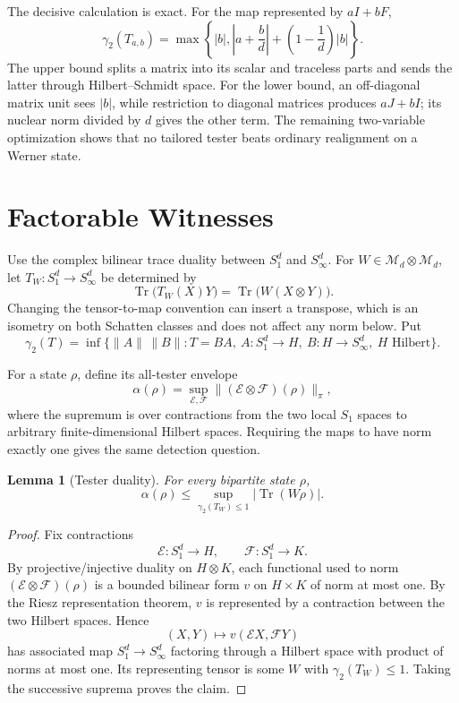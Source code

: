 \documentclass[11pt]{amsart}
\newtheorem{lemma}{Lemma}
\newcommand{\M}{\mathcal M}
\newcommand{\Tr}{\operatorname{Tr}}
\newcommand{\gammatwo}{\gamma_2}
\begin{document}
The decisive calculation is exact.  For the map represented by $aI+bF$,
\[
 \gammatwo(T_{a,b})
 =\max\left\{|b|,
 \left|a+\frac bd\right|+\left(1-\frac1d\right)|b|\right\}.
\]
The upper bound splits a matrix into its scalar and traceless parts and sends
the latter through Hilbert--Schmidt space.  For the lower bound, an
off-diagonal matrix unit sees $|b|$, while restriction to diagonal matrices
produces $aJ+bI$; its nuclear norm divided by $d$ gives the other term.
The remaining two-variable optimization shows that no tailored tester beats
ordinary realignment on a Werner state.

\section*{Factorable Witnesses}
\par\medskip
Use the complex bilinear trace duality between $S_1^d$ and $S_\infty^d$.
For $W\in\M_d\otimes\M_d$, let $T_W:S_1^d\to S_\infty^d$ be determined by
\[
 \Tr\bigl(T_W(X)Y\bigr)=\Tr\bigl(W(X\otimes Y)\bigr).
\]
Changing the tensor-to-map convention can insert a transpose, which is an
isometry on both Schatten classes and does not affect any norm below.  Put
\[
 \gammatwo(T)=\inf\{\|A\|\,\|B\|:
 T=BA,\ A:S_1^d\to H,\ B:H\to S_\infty^d,
 \ H\text{ Hilbert}\}.
\]

For a state $\rho$, define its all-tester envelope
\[
 \alpha(\rho)=\sup_{\mathcal E,\mathcal F}
 \|(\mathcal E\otimes\mathcal F)(\rho)\|_\pi,
\]
where the supremum is over contractions from the two local $S_1$ spaces to
arbitrary finite-dimensional Hilbert spaces.  Requiring the maps to have norm
exactly one gives the same detection question.

\begin{lemma}[Tester duality]\label{lem:duality}
For every bipartite state $\rho$,
\[
 \alpha(\rho)\leq
 \sup_{\gammatwo(T_W)\leq1}|\Tr(W\rho)|.
\]
\end{lemma}

\begin{proof}
Fix contractions
\[
 \mathcal E:S_1^d\to H,\qquad \mathcal F:S_1^d\to K.
\]
By projective/injective duality on $H\otimes K$,
each functional used to norm $(\mathcal E\otimes\mathcal F)(\rho)$ is a
bounded bilinear form $v$ on $H\times K$ of norm at most one.  By the Riesz
representation theorem, $v$ is represented by a contraction between the two
Hilbert spaces.  Hence
\[
 (X,Y)\longmapsto v(\mathcal E X,\mathcal F Y)
\]
has associated map $S_1^d\to S_\infty^d$ factoring through a Hilbert space
with product of norms at most one.  Its representing tensor is some $W$ with
$\gammatwo(T_W)\leq1$.  Taking the successive suprema proves the claim.
\end{proof}
\end{document}
